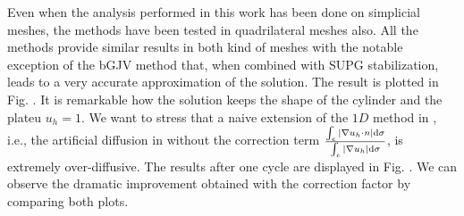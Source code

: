 


Even when the analysis performed in this work has been done on simplicial meshes, the methods have been tested in quadrilateral meshes also. All the methods provide similar results in both kind of meshes with the notable exception of the bGJV method that, when combined with SUPG stabilization, leads to a very accurate approximation of the solution. The result is plotted in Fig. . It is remarkable how the solution keeps the shape of the cylinder and the plateu $u_h=1$. We want to stress that a naive extension of the $1D$ method in \cite{burman_nonlinear_2007}, i.e., the artificial diffusion in  without the correction term $\frac{\int_e |\nabla u_h \cdot n|{\rm d} \sigma}{\int_e |\nabla u_h| {\rm d} \sigma}$, is extremely over-diffusive. The results after one cycle are displayed in Fig.  . We can observe the dramatic improvement obtained with the correction factor by comparing both plots.


